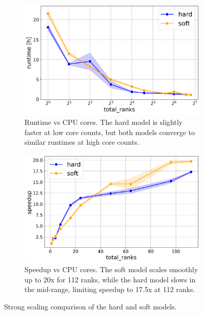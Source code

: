 \documentclass[conference]{IEEEtran}
\begin{document}
\begin{figure}[H]
    \centering
    \begin{subfigure}[b]{1\linewidth}
        \includegraphics[width=\linewidth]{figures/runtimes/strong_scaling_runtime_hard_soft.png}
        \caption{Runtime vs CPU cores. The hard model is slightly faster at low core counts, but both models converge to similar runtimes at high core counts.}
        \label{fig:runtime_hard_soft}
    \end{subfigure}


    \begin{subfigure}[b]{1\linewidth}
        \includegraphics[width=\linewidth]{figures/runtimes/strong_scaling_speedup_hard_soft.png}
        \caption{Speedup vs CPU cores. The soft model scales smoothly up to 20x for 112 ranks, while the hard model slows in the mid-range, limiting speedup to 17.5x at 112 ranks.}
        \label{fig:speedup_hard_soft}
    \end{subfigure}

    \caption{Strong scaling comparison of the hard and soft models.}
\end{figure}
\end{document}
